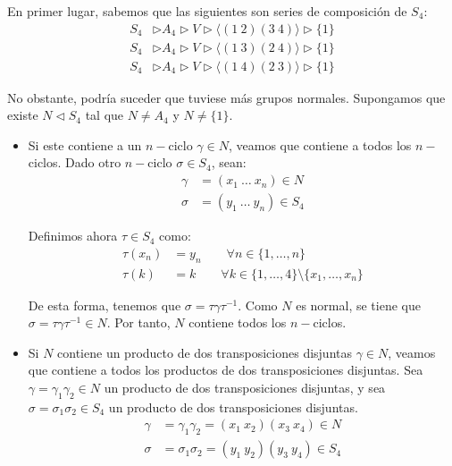 \begin{ejercicio}
\begin{enumerate}
        En primer lugar, sabemos que las siguientes son series de composición de $S_4$:
        \begin{align*}
            S_4 &\rhd A_4 \rhd V \rhd \langle (1\ 2)(3\ 4) \rangle  \rhd \{1\} \\
            S_4 &\rhd A_4 \rhd V \rhd \langle (1\ 3)(2\ 4) \rangle  \rhd \{1\} \\
            S_4 &\rhd A_4 \rhd V \rhd \langle (1\ 4)(2\ 3) \rangle  \rhd \{1\}
        \end{align*}

        No obstante, podría suceder que tuviese más grupos normales. Supongamos que existe $N\lhd S_4$ tal que $N\neq A_4$ y $N\neq \{1\}$.
        \begin{itemize}
            \item Si este contiene a un $n-$ciclo $\gamma\in N$, veamos que contiene a todos los $n-$ciclos. Dado otro $n-$ciclo $\sigma\in S_4$, sean:
            \begin{align*}
                \gamma &= (x_1\ \dots\ x_n)\in N \\
                \sigma &= (y_1\ \dots\ y_n)\in S_4
            \end{align*}

            Definimos ahora $\tau\in S_4$ como:
            \begin{align*}
                \tau(x_n) &= y_n\qquad \forall n\in \{1,\ldots,n\} \\
                \tau(k) &= k\qquad \forall k\in \{1,\ldots,4\}\setminus\{x_1,\ldots,x_n\}
            \end{align*}

            De esta forma, tenemos que $\sigma=\tau\gamma\tau^{-1}$. Como $N$ es normal, se tiene que $\sigma=\tau\gamma\tau^{-1}\in N$. Por tanto, $N$ contiene todos los $n-$ciclos.

            \item Si $N$ contiene un producto de dos transposiciones disjuntas $\gamma\in N$, veamos que contiene a todos los productos de dos transposiciones disjuntas. Sea $\gamma=\gamma_1\gamma_2\in N$ un producto de dos transposiciones disjuntas, y sea $\sigma=\sigma_1\sigma_2\in S_4$ un producto de dos transposiciones disjuntas.
            \begin{align*}
                \gamma &= \gamma_1\gamma_2=(x_1\ x_2)(x_3\ x_4)\in N \\
                \sigma &= \sigma_1\sigma_2=(y_1\ y_2)(y_3\ y_4)\in S_4
            \end{align*}
            

\end{itemize}
\end{enumerate}
\end{ejercicio}
